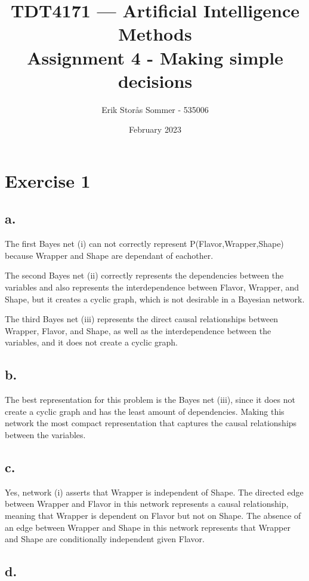 \documentclass{article}
\title{TDT4171 — Artificial Intelligence Methods \\ Assignment 4 - Making simple decisions}
\author{Erik Storås Sommer - 535006}
\date{February 2023}
\begin{document}
\maketitle

\section*{Exercise 1}

\subsection*{a.}

The first Bayes net (i) can not correctly represent P(Flavor,Wrapper,Shape) because Wrapper and Shape are dependant of eachother.

The second Bayes net (ii) correctly represents the dependencies between the variables and also represents the interdependence between Flavor, Wrapper, and Shape, but it creates a cyclic graph, which is not desirable in a Bayesian network.

The third Bayes net (iii) represents the direct causal relationships between Wrapper, Flavor, and Shape, as well as the interdependence between the variables, and it does not create a cyclic graph.

\subsection*{b.}

The best representation for this problem is the Bayes net (iii), since it does not create a cyclic graph and has the least amount of dependencies. Making this network the most compact representation that captures the causal relationships between the variables.


\subsection*{c.}

Yes, network (i) asserts that Wrapper is independent of Shape. The directed edge between Wrapper and Flavor in this network represents a causal relationship, meaning that Wrapper is dependent on Flavor but not on Shape. The absence of an edge between Wrapper and Shape in this network represents that Wrapper and Shape are conditionally independent given Flavor.

\subsection*{d.}
\end{document}
